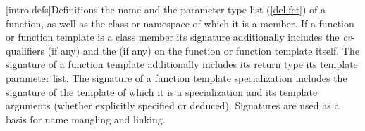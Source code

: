 \documentclass[american]{book}
\begin{document}
\begin{paras}
\setcounter{section}{2}
[intro.defs]{Definitions}
\setcounter{Paras}{10}
%
{the name and the parameter-type-list
(\mbox{\ref{dcl.fct}}) of a function, as well as the class or namespace 
of which it is a member. If a function or function template is a class
member its signature additionally includes the
\mbox{\textit{cv}}-qualifiers (if any) and the
 (if any) on the function or function
template itself. The signature of a function template additionally
includes its return type\mbox{} its template parameter 
list\mbox{}.
The signature
of a function template specialization includes the signature of the
template of which it is a specialization and its template arguments
(whether explicitly specified or deduced). \mbox{\enternote}Signatures
are used as a basis for name mangling and linking.\mbox{\exitnote} }
\end{paras}
\end{document}
